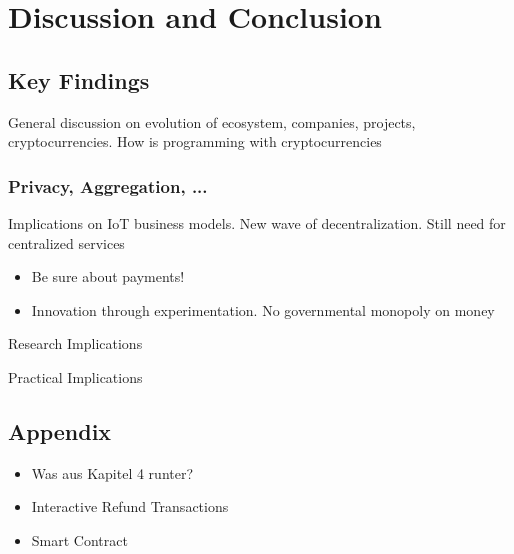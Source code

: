 \chapter{Discussion and Conclusion}
\label{sec:discussion}

\section{Key Findings}


General discussion on evolution of ecosystem, companies, projects, cryptocurrencies.
How is programming with cryptocurrencies


\subsection{Privacy, Aggregation, ...}

Implications on IoT business models. New wave of decentralization. Still need for centralized services

\begin{itemize}
	\item Be sure about payments!
	\item Innovation through experimentation. No governmental monopoly on money
\end{itemize}


Research Implications


Practical Implications


\subsection{}

\section{Appendix}

\begin{itemize}
	\item Was aus Kapitel 4 runter?
	\item Interactive Refund Transactions
	\item Smart Contract
\end{itemize}

